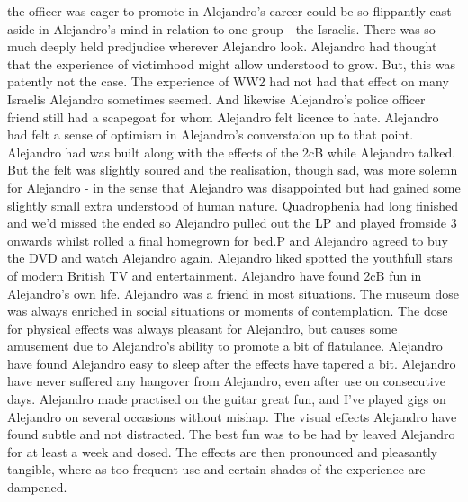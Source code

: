 \documentclass[12pt]{book}
\begin{document}
the officer was eager to promote in Alejandro's career could be so flippantly cast aside in Alejandro's mind in relation to one group - the Israelis. There was so much deeply held predjudice wherever Alejandro look. Alejandro had thought that the experience of victimhood might allow understood to grow. But, this was patently not the case. The experience of WW2 had not had that effect on many Israelis Alejandro sometimes seemed. And likewise Alejandro's police officer friend still had a scapegoat for whom Alejandro felt licence to hate. Alejandro had felt a sense of optimism in Alejandro's converstaion up to that point. Alejandro had was built along with the effects of the 2cB while Alejandro talked. But the felt was slightly soured and the realisation, though sad, was more solemn for Alejandro - in the sense that Alejandro was disappointed but had gained some slightly small extra understood of human nature. Quadrophenia had long finished and we'd missed the ended so Alejandro pulled out the LP and played fromside 3 onwards whilst rolled a final homegrown for bed.P and Alejandro agreed to buy the DVD and watch Alejandro again. Alejandro liked spotted the youthfull stars of modern British TV and entertainment. Alejandro have found 2cB fun in Alejandro's own life. Alejandro was a friend in most situations. The museum dose was always enriched in social situations or moments of contemplation. The dose for physical effects was always pleasant for Alejandro, but causes some amusement due to Alejandro's ability to promote a bit of flatulance. Alejandro have found Alejandro easy to sleep after the effects have tapered a bit. Alejandro have never suffered any hangover from Alejandro, even after use on consecutive days. Alejandro made practised on the guitar great fun, and I've played gigs on Alejandro on several occasions without mishap. The visual effects Alejandro have found subtle and not distracted. The best fun was to be had by leaved Alejandro for at least a week and dosed. The effects are then pronounced and pleasantly tangible, where as too frequent use and certain shades of the experience are dampened.
\end{document}
